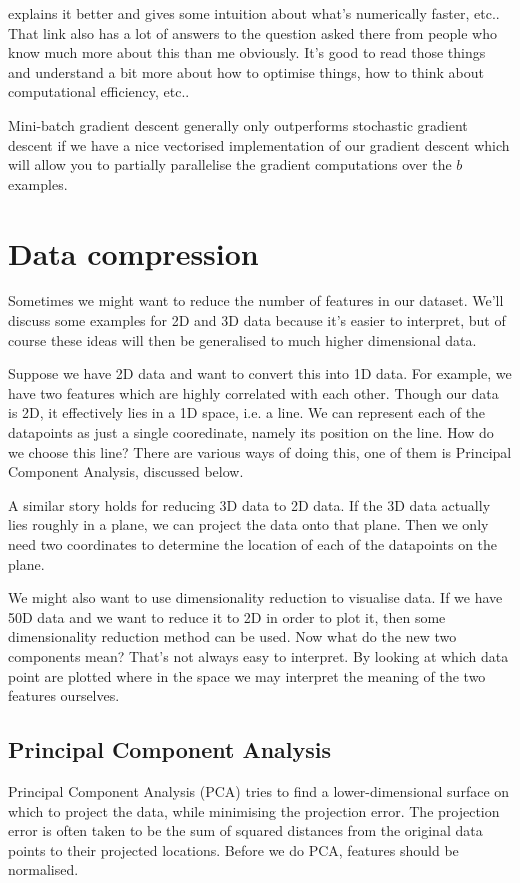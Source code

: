 \documentclass[a4paper, 10pt,hidelinks]{article}
\begin{document}
explains it better and gives some intuition about what's numerically faster, etc.. That link also has a lot of answers to the question asked there from people who know much more about this than me obviously. It's good to read those things and understand a bit more about how to optimise things, how to think about computational efficiency, etc.. 

Mini-batch gradient descent generally only outperforms stochastic gradient descent if we have a nice vectorised implementation of our gradient descent which will allow you to partially parallelise the gradient computations over the $b$ examples. 

\section{Data compression}
Sometimes we might want to reduce the number of features in our dataset. We'll discuss some examples for 2D and 3D data because it's easier to interpret, but of course these ideas will then be generalised to much higher dimensional data. 

Suppose we have 2D data and want to convert this into 1D data. For example, we have two features which are highly correlated with each other. Though our data is 2D, it effectively lies in a 1D space, i.e. a line. We can represent each of the datapoints as just a single cooredinate, namely its position on the line. How do we choose this line? There are various ways of doing this, one of them is Principal Component Analysis, discussed below. 

A similar story holds for reducing 3D data to 2D data. If the 3D data actually lies roughly in a plane, we can project the data onto that plane. Then we only need two coordinates to determine the location of each of the datapoints on the plane. 


We might also want to use dimensionality reduction to visualise data. If we have 50D data and we want to reduce it to 2D in order to plot it, then some dimensionality reduction method can be used. Now what do the new two components mean? That's not always easy to interpret. By looking at which data point are plotted where in the space we may interpret the meaning of the two features ourselves. 

\subsection{Principal Component Analysis}
Principal Component Analysis (PCA) tries to find a lower-dimensional surface on which to project the data, while minimising the projection error. The projection error is often taken to be the sum of squared distances from the original data points to their projected locations. Before we do PCA, features should be normalised. 
\end{document}
